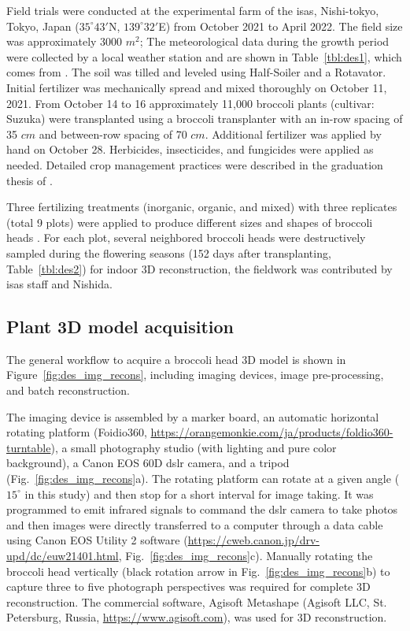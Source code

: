 Field trials were conducted at the experimental farm of the \gls{isas}, Nishi-tokyo, Tokyo, Japan ($35^\circ 43'$N, $139^\circ 32'$E) from October 2021 to April 2022. The field size was approximately 3000 $m^2$; The meteorological data during the growth period were collected by a local weather station and are shown in Table~\ref{tbl:des1}, which comes from \citet{nishida_estimation_2023}. The soil was tilled and leveled using Half-Soiler and a Rotavator. Initial fertilizer was mechanically spread and mixed thoroughly on October 11, 2021. From October 14 to 16 approximately 11,000 broccoli plants (cultivar: Suzuka) were transplanted using a broccoli transplanter with an in-row spacing of 35 $cm$ and between-row spacing of 70 $cm$. Additional fertilizer was applied by hand on October 28. Herbicides, insecticides, and fungicides were applied as needed. Detailed crop management practices were described in the graduation thesis of \citet{nishida_estimation_2023}.



Three fertilizing treatments (inorganic, organic, and mixed) with three replicates (total 9 plots) were applied to produce different sizes and shapes of broccoli heads \citep{nishida_estimation_2023}. For each plot, several neighbored broccoli heads were destructively sampled during the flowering seasons (152 days after transplanting, Table~\ref{tbl:des2}) for indoor 3D reconstruction, the fieldwork was contributed by \gls{isas} staff and Nishida.



\subsection{Plant 3D model acquisition}\label{sec:3ddb}

The general workflow to acquire a broccoli head 3D model is shown in Figure~\ref{fig:des_img_recons}, including imaging devices, image pre-processing, and batch reconstruction.



The imaging device is assembled by a marker board, an automatic horizontal rotating platform (Foidio360, \url{https://orangemonkie.com/ja/products/foldio360-turntable}), a small photography studio (with lighting and pure color background), a Canon EOS 60D \gls{dslr} camera, and a tripod (Fig.~\ref{fig:des_img_recons}a). The rotating platform can rotate at a given angle ($15^\circ$ in this study) and then stop for a short interval for image taking. It was programmed to emit infrared signals to command the \gls{dslr} camera to take photos and then images were directly transferred to a computer through a data cable using Canon EOS Utility 2 software (\url{https://cweb.canon.jp/drv-upd/dc/euw21401.html}, Fig.~\ref{fig:des_img_recons}c). Manually rotating the broccoli head vertically (black rotation arrow in Fig.~\ref{fig:des_img_recons}b) to capture three to five photograph perspectives was required for complete 3D reconstruction. The commercial software, Agisoft Metashape (Agisoft LLC, St. Petersburg, Russia, \url{https://www.agisoft.com}), was used for 3D reconstruction.

